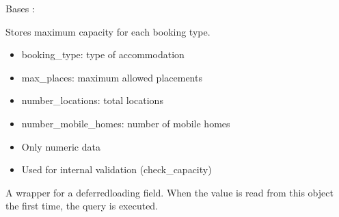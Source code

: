 \documentclass[letterpaper,10pt,french]{sphinxmanual}
\begin{document}
\begin{fulllineitems}
\label{\detokenize{index:bookings.models.Capacity}}
\pysigstartsignatures
\pysiglinewithargsret
{}
{\sphinxparamcomma {}}
{}
\pysigstopsignatures
\sphinxAtStartPar
Bases : 

\sphinxAtStartPar
Stores maximum capacity for each booking type.
\begin{description}
\begin{itemize}
\item {} 
\sphinxAtStartPar
booking\_type: type of accommodation

\item {} 
\sphinxAtStartPar
max\_places: maximum allowed placements

\item {} 
\sphinxAtStartPar
number\_locations: total locations

\item {} 
\sphinxAtStartPar
number\_mobile\_homes: number of mobile homes

\end{itemize}

\begin{itemize}
\item {} 
\sphinxAtStartPar
Only numeric data

\item {} 
\sphinxAtStartPar
Used for internal validation (check\_capacity)

\end{itemize}

\end{description}

\begin{fulllineitems}
\label{\detokenize{index:bookings.models.Capacity.booking_type}}
\pysigstartsignatures
\pysigline
{}
\pysigstopsignatures
\sphinxAtStartPar
A wrapper for a deferred\sphinxhyphen{}loading field. When the value is read from this
object the first time, the query is executed.

\end{fulllineitems}


\end{fulllineitems}
\end{document}
